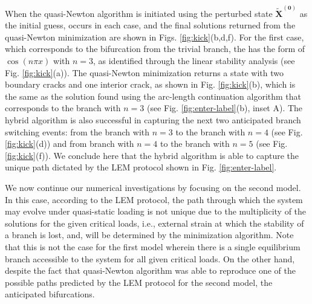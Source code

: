 When the quasi-Newton algorithm is initiated using the perturbed state \(\mathbf{\tilde X^{(0)}}\)
as the initial guess,  occurs in each case, and the final solutions returned from the quasi-Newton minimization are shown in Figs. \ref{fig:kick}(b,d,f). For the first case, which corresponds to the bifurcation from the trivial branch, the  has the form of \(\cos(n\pi x)\) with \(n=3\), as identified through the linear stability analysis (see Fig. \ref{fig:kick}(a)). The quasi-Newton minimization returns a state with two boundary cracks and one interior crack, as shown in Fig. \ref{fig:kick}(b), which is the same as the solution found using the arc-length continuation algorithm that corresponds to the branch with \(n=3\) (see Fig. \ref{fig:enter-label}(b), inset A).  The hybrid algorithm is also successful in capturing the next two  anticipated branch   switching events: from the  branch with \(n=3\)  to the branch  with \(n=4\) (see Fig. \ref{fig:kick}(d)) and  from branch with \(n=4\)  to the branch  with \(n=5\) (see Fig. \ref{fig:kick}(f)).   We  conclude here that the hybrid algorithm is able to capture the unique path dictated by the LEM protocol shown in Fig. \ref{fig:enter-label}.   

We now continue our numerical investigations by focusing on the second model. In this case, according to the LEM protocol, the path through which the system may evolve under quasi-static loading is not unique due to the multiplicity of the solutions for  the given critical loads, i.e., external strain at which the stability of a branch is lost,  and, will be determined by the minimization algorithm.
Note that this is not the case for the first model wherein there is a single equilibrium branch accessible to the system for all given critical loads.
On the other hand, despite the fact that quasi-Newton algorithm was able to reproduce one of the possible paths predicted by the LEM protocol for the second model, the   anticipated bifurcations. 


